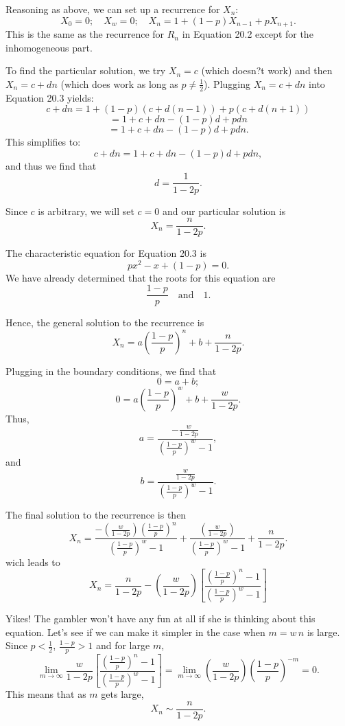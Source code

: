 \documentclass[12pt,a4paper]{article}
\begin{document}
	Reasoning as above, we can set up a recurrence for \( X_n \):
	\[
	X_0 = 0;
	\quad X_w = 0;
	\quad X_n = 1 + (1 - p) X_{n-1} + p X_{n+1}. \tag{20.3}
	\]
	This is the same as the recurrence for \( R_n \) in Equation 20.2 except for the inhomogeneous part.
	
	To find the particular solution, we try \( X_n = c \) (which doesn?t work) and then \( X_n = c + d n \) (which does work as long as \( p \neq \frac{1}{2} \)). Plugging \( X_n = c + d n \) into Equation 20.3 yields:
	\[
	c + d n = 1 + (1 - p)(c + d(n - 1)) + p(c + d(n + 1))
	\]
	\[
	= 1 + c + d n - (1 - p) d + p d n
	\]
	\[
	= 1 + c + d n - (1 - p) d + p d n.
	\]
	This simplifies to:
	\[
	c + d n = 1 + c + d n - (1 - p) d + p d n,
	\]
	and thus we find that
	\[
	d = \frac{1}{1 - 2p}.
	\]
	
	Since \( c \) is arbitrary, we will set \( c = 0 \) and our particular solution is
	\[
	X_n = \frac{n}{1 - 2p}.
	\]
	
	The characteristic equation for Equation 20.3 is
	\[
	p x^2 - x + (1 - p) = 0.
	\]
	We have already determined that the roots for this equation are
	\[
	\frac{1 - p}{p} \quad \text{and} \quad 1.
	\]
	
	Hence, the general solution to the recurrence is
	\[
	X_n = a \left( \frac{1 - p}{p} \right)^n + b + \frac{n}{1 - 2p}.
	\]
	
	Plugging in the boundary conditions, we find that
	\[
	0 = a + b;
	\]
	\[
	0 = a \left( \frac{1 - p}{p} \right)^w + b + \frac{w}{1 - 2p}. \tag{15}
	\]
	Thus,
	\[
	a =\frac{- \frac{w}{1 - 2p}}{ \left( \frac{1 - p}{p} \right)^w - 1},
	\]
	and
	\[
	b = \frac{\frac{w}{1 - 2p}}{ \left( \frac{1 - p}{p} \right)^w - 1}.
	\]
	
	The final solution to the recurrence is then
	\[
	X_n = \frac{-\left(\frac{w}{1 - 2p}\right) \left( \frac{1 - p}{p} \right)^n}{ \left( \frac{1 - p}{p} \right)^w - 1 }+\frac{ \left(\frac{w}{1 - 2p}\right)}{ \left( \frac{1 - p}{p} \right)^w - 1} + \frac{n}{ 1 - 2p}.
	\]
	wich leads to
	$$
	X_n = \frac{n}{ 1 - 2p} - \left(\frac{w}{1 - 2p}\right)\left[\frac{\left( \frac{1 - p}{p} \right)^n - 1 }{\left( \frac{1 - p}{p} \right)^w - 1 }\right]
	$$
	
	Yikes! The gambler won't have any fun at all if she is thinking about this equation. 
	Let's see if we can make it simpler in the case when \( m = w \, n \) is large. Since \( p < \frac{1}{2} \), \( \frac{1 - p}{p} > 1 \) and for large \( m \),
	\[
	\lim_{m \to \infty} \frac{w}{1 - 2p} \left[\frac{\left( \frac{1 - p}{p} \right)^n - 1 }{\left( \frac{1 - p}{p} \right)^w - 1 }\right] = \lim_{m \to \infty} \left(\frac{w}{1 - 2p} \right)\left(\frac{1 - p}{p} \right)^{-m}
	= 0.
	\]
	This means that as \( m \) gets large,
	\[
	X_n \sim \frac{n}{1 - 2p}.
	\]
	
\end{document}
